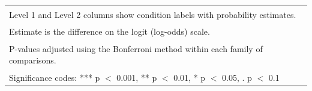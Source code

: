 \begin{table}[!h]
{\begin{tabular}[t]{llllllll}
 &  &  &  &  &  &  & \\
\bottomrule
\multicolumn{8}{l}{\textsuperscript{} Level 1 and Level 2 columns show condition labels with probability estimates.}\\
\multicolumn{8}{l}{\textsuperscript{} Estimate is the difference on the logit (log-odds) scale.}\\
\multicolumn{8}{l}{\textsuperscript{} P-values adjusted using the Bonferroni method within each family of comparisons.}\\
\multicolumn{8}{l}{\textsuperscript{} Significance codes: *** p $<$ 0.001, ** p $<$ 0.01, * p $<$ 0.05, . p $<$ 0.1}\\
\end{tabular}}
\end{table}
